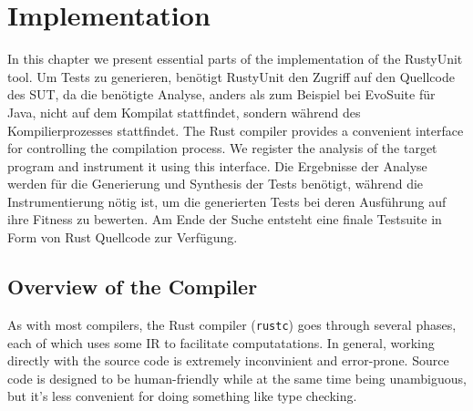 \documentclass{article}
\begin{document}

\section{Implementation}
In this chapter we present essential parts of the implementation of the RustyUnit tool. Um Tests zu generieren, benötigt RustyUnit den Zugriff auf den Quellcode des SUT, da die benötigte Analyse, anders als zum Beispiel bei EvoSuite für Java, nicht auf dem Kompilat stattfindet, sondern während des Kompilierprozesses stattfindet. The Rust compiler provides a convenient interface for controlling the compilation process. We register the analysis of the target program and instrument it using this interface. Die Ergebnisse der Analyse werden für die Generierung und Synthesis der Tests benötigt, während die Instrumentierung nötig ist, um die generierten Tests bei deren Ausführung auf ihre Fitness zu bewerten. Am Ende der Suche entsteht eine finale Testsuite in Form von Rust Quellcode zur Verfügung.

\subsection{Overview of the Compiler}
As with most compilers, the Rust compiler (\lstinline{rustc}) goes through several phases, each of which uses some \ac{IR} to facilitate computatations. In general, working directly with the source code is extremely inconvinient and error-prone. Source code is designed to be human-friendly while at the same time being unambiguous, but it's less convenient for doing something like type checking.
\end{document}
